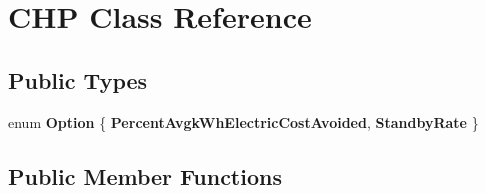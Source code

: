 \hypertarget{class_c_h_p}{}\section{C\+HP Class Reference}
\label{class_c_h_p}
\subsection*{Public Types}
\begin{DoxyCompactItemize}
\item 
\mbox{\label{class_c_h_p_ac82f530412021ace928a7e95c1295d06}} 
enum {\bfseries Option} \{ {\bfseries Percent\+Avgk\+Wh\+Electric\+Cost\+Avoided}, 
{\bfseries Standby\+Rate}
 \}
\end{DoxyCompactItemize}
\subsection*{Public Member Functions}

